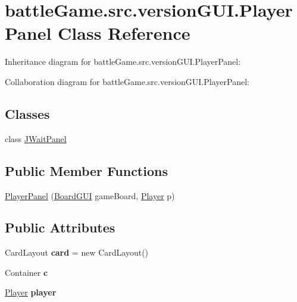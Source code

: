 \hypertarget{classbattleGame_1_1src_1_1versionGUI_1_1PlayerPanel}{}\section{battle\+Game.\+src.\+version\+G\+U\+I.\+Player\+Panel Class Reference}
\label{classbattleGame_1_1src_1_1versionGUI_1_1PlayerPanel}


Inheritance diagram for battle\+Game.\+src.\+version\+G\+U\+I.\+Player\+Panel\+:


Collaboration diagram for battle\+Game.\+src.\+version\+G\+U\+I.\+Player\+Panel\+:
\subsection*{Classes}
\begin{DoxyCompactItemize}
\item 
class \hyperlink{classbattleGame_1_1src_1_1versionGUI_1_1PlayerPanel_1_1JWaitPanel}{J\+Wait\+Panel}
\end{DoxyCompactItemize}
\subsection*{Public Member Functions}
\begin{DoxyCompactItemize}
\item 
\hyperlink{classbattleGame_1_1src_1_1versionGUI_1_1PlayerPanel_adcbed0e5932272cc6338d61aca111890}{Player\+Panel} (\hyperlink{classbattleGame_1_1src_1_1versionGUI_1_1BoardGUI}{Board\+G\+UI} game\+Board, \hyperlink{classbattleGame_1_1src_1_1versionGUI_1_1Player}{Player} p)
\end{DoxyCompactItemize}
\subsection*{Public Attributes}
\begin{DoxyCompactItemize}
\item 
Card\+Layout {\bfseries card} = new Card\+Layout()\hypertarget{classbattleGame_1_1src_1_1versionGUI_1_1PlayerPanel_a853a8ac1d7e157227ca6b186ecea8764}{}\label{classbattleGame_1_1src_1_1versionGUI_1_1PlayerPanel_a853a8ac1d7e157227ca6b186ecea8764}

\item 
Container {\bfseries c}\hypertarget{classbattleGame_1_1src_1_1versionGUI_1_1PlayerPanel_a438a7c4b746f5d71323276168bc00ec4}{}\label{classbattleGame_1_1src_1_1versionGUI_1_1PlayerPanel_a438a7c4b746f5d71323276168bc00ec4}

\item 
\hyperlink{classbattleGame_1_1src_1_1versionGUI_1_1Player}{Player} {\bfseries player}\hypertarget{classbattleGame_1_1src_1_1versionGUI_1_1PlayerPanel_a568d6c880ea94038f1aa6af38d2c6299}{}\label{classbattleGame_1_1src_1_1versionGUI_1_1PlayerPanel_a568d6c880ea94038f1aa6af38d2c6299}

\end{DoxyCompactItemize}


